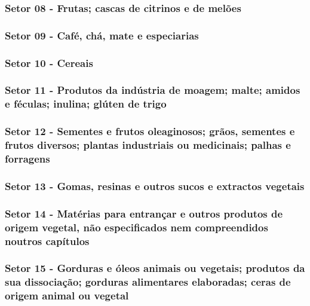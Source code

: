 \subsubsection{Setor 08 - Frutas; cascas de citrinos e de melões}

 
\subsubsection{Setor 09 - Café, chá, mate e especiarias}

 

\newpage

\subsubsection{Setor 10 - Cereais}



\newpage

\subsubsection{Setor 11 - Produtos da indústria de moagem; malte; amidos e féculas; inulina; glúten de trigo}



\newpage

\subsubsection{Setor 12 - Sementes e frutos oleaginosos; grãos, sementes e frutos diversos; plantas industriais ou medicinais; palhas e forragens}



\newpage

\subsubsection{Setor 13 - Gomas, resinas e outros sucos e extractos vegetais}



\subsubsection{Setor 14 - Matérias para entrançar e outros produtos de origem vegetal, não especificados nem compreendidos noutros capítulos}



\newpage

\subsubsection{Setor 15 - Gorduras e óleos animais ou vegetais; produtos da sua dissociação; gorduras alimentares elaboradas; ceras de origem animal ou vegetal}

 